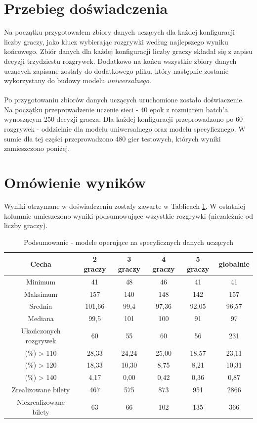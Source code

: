 \documentclass[12pt, oneside]{report}
\begin{document}
\section{Przebieg doświadczenia}
Na początku przygotowałem zbiory danych uczących dla każdej konfiguracji liczby graczy, jako klucz wybierając rozgrywki według najlepszego wyniku końcowego. Zbiór danych dla każdej konfiguracji liczby graczy składał się z zapisu decyzji trzydziestu rozgrywek. Dodatkowo na końcu wszystkie zbiory danych uczących zapisane zostały do dodatkowego pliku, który następnie zostanie wykorzystany do budowy modelu \textit{uniwersalnego}. \\ \\
Po przygotowaniu zbiorów danych uczących uruchomione zostało doświaczenie. Na początku przeprowadzenie uczenie sieci - 40 epok z rozmiarem batch'a wynoszącym 250 decyzji gracza. Dla każdej konfiguracji przeprowadzono po 60 rozgrywek - oddzielnie dla modelu uniwersalnego oraz modelu specyficznego. W sumie dla tej części przeprowadzono 480 gier testowych, których wyniki zamieszczono poniżej.
\section{Omówienie wyników}
Wyniki otrzymane w doświadczeniu zostały zawarte w Tablicach \ref{table:nn_single_test}. W ostatniej kolumnie umieszczono wyniki podsumowujące wszystkie rozgrywki (niezależnie od liczby graczy).
\begin{table}[h]
	\begin{center}
		\begin{tabular}{| c | c | c | c | c | c |} \hline
			Cecha & 2 graczy & 3 graczy & 4 graczy & 5 graczy & globalnie \\ \hline
			Minimum & 41 & 48 & 46 & 41 & 41 \\ \hline
			Maksimum & 157 & 140 & 148 & 142 & 157 \\ \hline
			Srednia & 101,66 & 99,4 & 97,36 & 92,05 & 96,57 \\ \hline
			Mediana & 99,5 & 101 & 100 & 91 & 97 \\ \hline
			Ukończonych rozgrywek & 60 & 55 & 60 & 56 & 231 \\ \hline
			(\%) > 110 & 28,33 & 24,24 & 25,00 & 18,57 & 23,11 \\ \hline
			(\%) > 120 & 18,33 & 10,30 & 8,75 & 8,21 & 10,31 \\ \hline
			(\%) > 140 & 4,17 & 0,00 & 0,42 & 0,36 & 0,87 \\ \hline
			Zrealizowane bilety & 467 & 575 & 873 & 951 & 2866 \\ \hline
			Niezrealizowane bilety & 63 & 66 & 102 & 135 & 366 \\ \hline
		\end{tabular}
		\caption{Podsumowanie - modele operujące na specyficznych danych uczących}
		\label{table:nn_single_test}
	\end{center}
\end{table}
\end{document}
